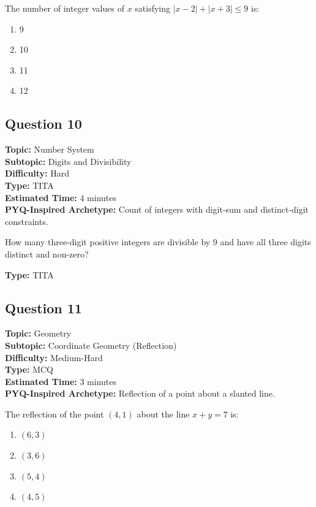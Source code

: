 \documentclass[11pt]{article}
\begin{document}
\begin{tcolorbox}
The number of integer values of \(x\) satisfying \(|x-2| + |x+3| \le 9\) is:
\end{tcolorbox}
\begin{enumerate}[label=(\Alph*)]
\item 9
\item 10
\item 11
\item 12
\end{enumerate}

\subsection*{Question 10}
\textbf{Topic:} Number System \\
\textbf{Subtopic:} Digits and Divisibility \\
\textbf{Difficulty:} Hard \\
\textbf{Type:} TITA \\
\textbf{Estimated Time:} 4 minutes \\
\textbf{PYQ-Inspired Archetype:} Count of integers with digit-sum and distinct-digit constraints.

\begin{tcolorbox}
How many three-digit positive integers are divisible by 9 and have all three digits distinct and non-zero?
\end{tcolorbox}
\textbf{Type:} TITA

\subsection*{Question 11}
\textbf{Topic:} Geometry \\
\textbf{Subtopic:} Coordinate Geometry (Reflection) \\
\textbf{Difficulty:} Medium-Hard \\
\textbf{Type:} MCQ \\
\textbf{Estimated Time:} 3 minutes \\
\textbf{PYQ-Inspired Archetype:} Reflection of a point about a slanted line.

\begin{tcolorbox}
The reflection of the point \((4, 1)\) about the line \(x + y = 7\) is:
\end{tcolorbox}
\begin{enumerate}[label=(\Alph*)]
\item \((6, 3)\)
\item \((3, 6)\)
\item \((5, 4)\)
\item \((4, 5)\)
\end{enumerate}
\end{document}
